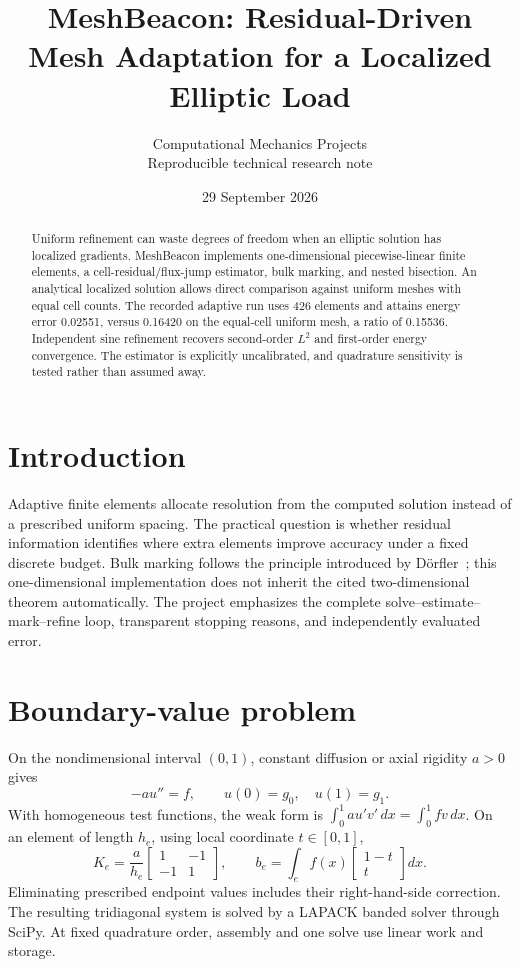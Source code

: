 \documentclass[10pt,a4paper]{article}
\title{\vspace{-1.3cm}\LARGE MeshBeacon: Residual-Driven Mesh Adaptation for a Localized Elliptic Load}
\author{\small Computational Mechanics Projects\\\small Reproducible technical research note}
\date{\small 29 September 2026}
\begin{document}
\maketitle\thispagestyle{fancy}

\begin{abstract}
Uniform refinement can waste degrees of freedom when an elliptic solution has localized gradients. MeshBeacon implements one-dimensional piecewise-linear finite elements, a cell-residual/flux-jump estimator, bulk marking, and nested bisection. An analytical localized solution allows direct comparison against uniform meshes with equal cell counts. The recorded adaptive run uses 426 elements and attains energy error 0.02551, versus 0.16420 on the equal-cell uniform mesh, a ratio of 0.15536. Independent sine refinement recovers second-order $L^2$ and first-order energy convergence. The estimator is explicitly uncalibrated, and quadrature sensitivity is tested rather than assumed away.
\end{abstract}
\section{Introduction}
Adaptive finite elements allocate resolution from the computed solution instead of a prescribed uniform spacing. The practical question is whether residual information identifies where extra elements improve accuracy under a fixed discrete budget. Bulk marking follows the principle introduced by D\"orfler~\cite{dorfler}; this one-dimensional implementation does not inherit the cited two-dimensional theorem automatically. The project emphasizes the complete solve--estimate--mark--refine loop, transparent stopping reasons, and independently evaluated error.
\section{Boundary-value problem}
On the nondimensional interval $(0,1)$, constant diffusion or axial rigidity $a>0$ gives
\begin{equation}
-a u''=f,\qquad u(0)=g_0,\quad u(1)=g_1.
\end{equation}
With homogeneous test functions, the weak form is $\int_0^1au'v'\,dx=\int_0^1fv\,dx$. On an element of length $h_e$, using local coordinate $t\in[0,1]$,
\begin{equation}
K_e=\frac{a}{h_e}\begin{bmatrix}1&-1\\-1&1\end{bmatrix},\qquad
b_e=\int_e f(x)\begin{bmatrix}1-t\\t\end{bmatrix}dx.
\end{equation}
Eliminating prescribed endpoint values includes their right-hand-side correction. The resulting tridiagonal system is solved by a LAPACK banded solver through SciPy. At fixed quadrature order, assembly and one solve use linear work and storage.
\end{document}
